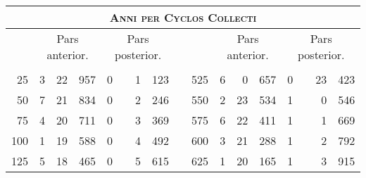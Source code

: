 %
\begin{tabnums} %
\footnotesize
\centering
\setlength{\tabcolsep}{1.0ex}
%
\newcommand{\cwd}{3.2em}
\newcommand{\da}{{\tiny †}}
\newcommand{\db}{{\scriptsize o}}
\newcommand{\ang}{90}
\newcommand{\hsb}[1]{\footnotesize{#1}}
\newcommand{\hsa}[1]{\tiny{#1}}
%
\newcommand{\hdrB}{%
  ~ &
  \multicolumn{3}{c}{\hsb{Pars anterior.}} &
  \multicolumn{4}{c}{\hsb{Pars posterior.}}  
}
%
\newcommand{\hdrA}{%
  \ch{\hsa{Anni per}}{\hsa{Anni per cyclos collecti.}} &
  \ch{\hsa{Feria.}}{\hsa{Feria.}}&
  \ch{\hsa{Hor.}}{\hsa{Hor.}} &
  \ch{\hsa{Scrup.}}{\hsa{Scrup.}} &
  \ch{\hsa{Dies.}}{\hsa{Dies.}} & & %
  \ch{\hsa{Hor.}}{\hsa{Hor.}} &
  \ch{\hsa{Scrup.}}{\hsa{Scrup.}}
}
%
\newcommand{\hdrs}{%
\hdrB && \hdrB\\
\cmidrule(lr){2-4} \cmidrule(lr){5-8} \cmidrule(lr){11-13} \cmidrule(lr){14-17}
\hdrA && \hdrA\\
}
%
\begin{tabular}[c]{@{} r rrr r@{}lrr c r rrr r@{}lrr @{}}
\toprule
\multicolumn{17}{c}{\Large\textsc{Anni per Cyclos Collecti}} \\
\toprule
\hdrs %
\midrule
  25 & 3 & 22 &  957 & 0&&  1 &  123 &&  525 & 6 &  0 &  657 & 0&& 23 &  423 \\
  50 & 7 & 21 &  834 & 0&&  2 &  246 &&  550 & 2 & 23 &  534 & 1&&  0 &  546 \\
  75 & 4 & 20 &  711 & 0&&  3 &  369 &&  575 & 6 & 22 &  411 & 1&&  1 &  669 \\
 100 & 1 & 19 &  588 & 0&&  4 &  492 &&  600 & 3 & 21 &  288 & 1&&  2 &  792 \\
 125 & 5 & 18 &  465 & 0&&  5 &  615 &&  625 & 1 & 20 &  165 & 1&&  3 &  915 \\

\end{tabular}
\end{tabnums}
